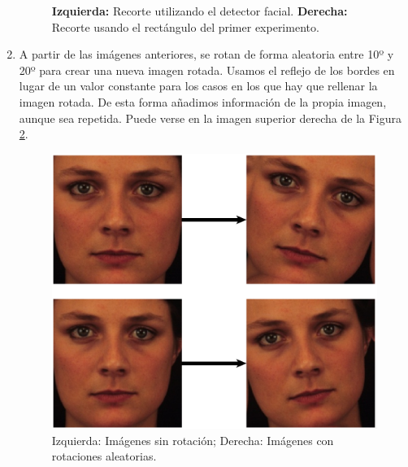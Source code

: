 \documentclass[a4paper,11pt]{book}
\begin{document}
\begin{enumerate}
\begin{figure}[h]
			\caption[Experimento 2 Rectangulo vs Detector]{\textbf{Izquierda:} Recorte utilizando el detector facial. \textbf{Derecha:} Recorte usando el rectángulo del primer experimento.}
			\label{fig:segundoIntentoDA2}
		\end{figure}
	\item A partir de las imágenes anteriores, se rotan de forma aleatoria entre 10º y 20º para crear una nueva imagen rotada. Usamos el reflejo de los bordes en lugar de un valor constante para los casos en los que hay que rellenar la imagen rotada. De esta forma añadimos información de la propia imagen, aunque sea repetida. Puede verse en la imagen superior derecha de la Figura \ref{fig:segundoIntentoDA3}.
		\begin{figure}[h]
			\centering
			\includegraphics[width=0.7\linewidth]{imagenes/segundoIntentoDA3}
			\caption[Experimento 2 Rotaciones]{ Izquierda: Imágenes sin rotación; Derecha: Imágenes con rotaciones aleatorias.}
			\label{fig:segundoIntentoDA3}
		\end{figure}
	

\end{enumerate}
\end{document}
